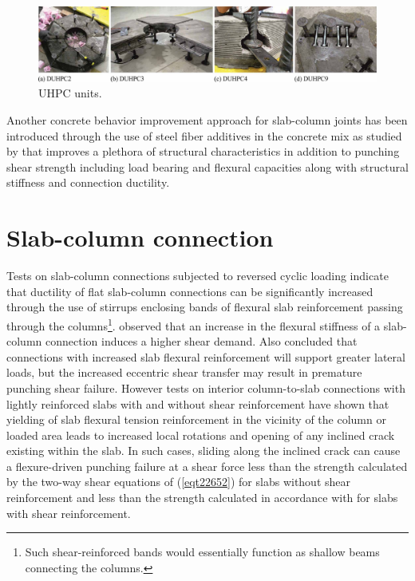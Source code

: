 \documentclass[twocolumn]{article} %
\begin{document}
    \begin{figure}\centering
        \includegraphics[width=\textwidth]{Figures/r2017f2.pdf}\caption{UHPC units\citep{ricker2017}.}\label{r2017f2}
        \end{figure}
Another concrete behavior improvement approach for slab-column joints has been introduced through the use of steel fiber additives in the concrete mix as studied by \cite{gouveia2018,gouveia2014,ABDELRAHMAN2018272,ju2015} that improves a plethora of structural characteristics in addition to punching shear strength including load bearing and flexural capacities along with structural stiffness and connection ductility. 
\section{Slab-column connection}
Tests on slab-column connections subjected to reversed cyclic loading\citep{carpenter1973design,symonds1976slab} indicate that ductility of flat slab-column connections can be significantly increased through the use of stirrups enclosing bands of flexural slab reinforcement passing through the columns\footnote{Such shear-reinforced bands would essentially function as shallow beams connecting the columns.}. \citep{Robertson2006} observed that an increase in the flexural stiffness of a slab-column connection induces a higher shear demand. Also \citep{Robertson2006} concluded that connections with increased slab flexural reinforcement will support greater lateral loads, but the increased eccentric shear transfer may result in premature punching shear failure. However tests on interior column-to-slab connections with lightly reinforced slabs with and without shear reinforcement \citep{peiris2012flexural,hawkins2017effect,bayrak2009two,muttoni2008punching,dam2017behavior,muttoni2008punching} have shown that yielding of slab flexural tension reinforcement in the vicinity of the column or loaded area leads to increased local rotations and opening of any inclined crack existing within the slab. In such cases, sliding along the inclined crack can cause a flexure-driven punching failure at a shear force less than the strength calculated by the two-way shear equations of \citet[Table 22.6.5.2]{aci31819} (\ref{eqt22652}) for slabs without shear reinforcement and less than the strength calculated in accordance with \citet[Section 22.6.6.3]{aci31819} for slabs with shear reinforcement. 
\end{document}

